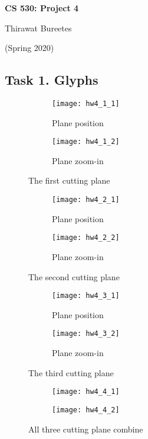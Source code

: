 \documentclass[11pt]{article}
\begin{document}
\begin{center}
\Large{\textbf{CS 530: Project 4}}

Thirawat Bureetes

(Spring 2020)
\end{center}

\subsection*{Task 1. Glyphs}

\begin{figure}[H]
\begin{subfigure}{.5\textwidth}
  \centering
  \texttt{[image: hw4\_1\_1]}
  \caption{Plane position}
  \label{fig:hw4_1_1}
\end{subfigure}
\begin{subfigure}{.5\textwidth}
  \centering
  \texttt{[image: hw4\_1\_2]}
  \caption{Plane zoom-in}
  \label{fig:hw4_1_2}
\end{subfigure}
\caption{The first cutting plane}
\label{fig:hw4_1}
\end{figure}

\begin{figure}[H]
\begin{subfigure}{.5\textwidth}
  \centering
  \texttt{[image: hw4\_2\_1]}
  \caption{Plane position}
  \label{fig:hw4_2_1}
\end{subfigure}
\begin{subfigure}{.5\textwidth}
  \centering
  \texttt{[image: hw4\_2\_2]}
  \caption{Plane zoom-in}
  \label{fig:hw4_2_2}
\end{subfigure}
\caption{The second cutting plane}
\label{fig:hw4_2}
\end{figure}

\begin{figure}[H]
\begin{subfigure}{.5\textwidth}
  \centering
  \texttt{[image: hw4\_3\_1]}
  \caption{Plane position}
  \label{fig:hw4_3_1}
\end{subfigure}
\begin{subfigure}{.5\textwidth}
  \centering
  \texttt{[image: hw4\_3\_2]}
  \caption{Plane zoom-in}
  \label{fig:hw4_3_2}
\end{subfigure}
\caption{The third cutting plane}
\label{fig:hw4_3}
\end{figure}

\begin{figure}[H]
\begin{subfigure}{.5\textwidth}
  \centering
  \texttt{[image: hw4\_4\_1]}
  \caption{}
  \label{fig:hw4_4_1}
\end{subfigure}
\begin{subfigure}{.5\textwidth}
  \centering
  \texttt{[image: hw4\_4\_2]}
  \caption{}
  \label{fig:hw4_4_2}
\end{subfigure}
\caption{All three cutting plane combine}
\label{fig:hw4_4}
\end{figure}
\end{document}
